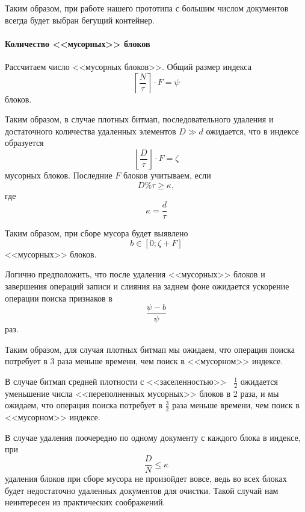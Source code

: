 Таким образом, при работе нашего прототипа с большим числом документов всегда
будет выбран бегущий контейнер.

\paragraph{Количество <<мусорных>> блоков}

Рассчитаем число <<мусорных блоков>>. Общий размер индекса
\begin{equation}
    \left\lceil\frac{N}{\tau}\right\rceil \cdot F = \psi
\end{equation}
блоков.

Таким образом, в случае плотных битмап, последовательного удаления и достаточного
количества удаленных элементов $D \gg d$ ожидается, что в индексе образуется
\begin{equation}
    \left\lfloor\frac{D}{\tau}\right\rfloor \cdot F = \zeta
\end{equation}
мусорных блоков. Последние $F$ блоков учитываем, если 
\begin{equation}
    D \% \tau \geq \kappa,
\end{equation}
где
\begin{equation}
    \kappa = \frac{d}{\tau}
\end{equation}

Таким образом, при сборе мусора будет выявлено
\begin{equation}
    b \in \left[0;\zeta + F\right]
\end{equation}
<<мусорных>> блоков.

Логично предположить, что после удаления <<мусорных>> блоков и завершения операций
записи и слияния на заднем фоне ожидается ускорение операции поиска признаков в 
\begin{equation}
    \frac{\psi - b}{\psi}
\end{equation}
раз.

Таким образом, для случая плотных битмап мы ожидаем, что операция поиска потребует
в 3 раза меньше времени, чем поиск в <<мусорном>> индексе.

В случае битмап средней плотности с <<заселенностью>> ~$\frac{1}{2}$ ожидается
уменьшение числа <<переполненных мусорных>> блоков в 2 раза, и мы
ожидаем, что операция поиска потребует в $\frac{3}{2}$ раза меньше времени, чем поиск в
<<мусорном>> индексе.

В случае удаления поочередно по одному документу с каждого блока в индексе, при
\begin{equation}
    \frac{D}{N} \leq \kappa
\end{equation}
удаления блоков при сборе мусора не произойдет вовсе, ведь во всех блоках будет
недостаточно удаленных документов для очистки. Такой случай нам неинтересен из
практических соображений.

